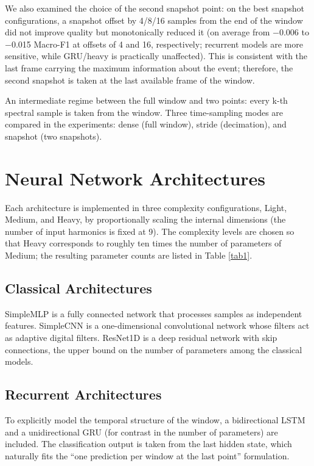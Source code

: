 \documentclass{ieeeojies}
\begin{document}
We also examined the choice of the second snapshot point: on the best snapshot configurations, a snapshot offset by 4/8/16 samples from the end of the window did not improve quality but monotonically reduced it (on average from $-$0.006 to $-$0.015 Macro-F1 at offsets of 4 and 16, respectively; recurrent models are more sensitive, while GRU/heavy is practically unaffected). This is consistent with the last frame carrying the maximum information about the event; therefore, the second snapshot is taken at the last available frame of the window.

An intermediate regime between the full window and two points: every k-th spectral sample is taken from the window. Three time-sampling modes are compared in the experiments: dense (full window), stride (decimation), and snapshot (two snapshots).

\section{Neural Network Architectures}

Each architecture is implemented in three complexity configurations, Light, Medium, and Heavy, by proportionally scaling the internal dimensions (the number of input harmonics is fixed at 9). The complexity levels are chosen so that Heavy corresponds to roughly ten times the number of parameters of Medium; the resulting parameter counts are listed in Table \ref{tab1}.

\subsection{Classical Architectures}

SimpleMLP is a fully connected network that processes samples as independent features. SimpleCNN is a one-dimensional convolutional network whose filters act as adaptive digital filters. ResNet1D is a deep residual network with skip connections, the upper bound on the number of parameters among the classical models.

\subsection{Recurrent Architectures}

To explicitly model the temporal structure of the window, a bidirectional LSTM and a unidirectional GRU (for contrast in the number of parameters) are included. The classification output is taken from the last hidden state, which naturally fits the ``one prediction per window at the last point'' formulation.
\end{document}
